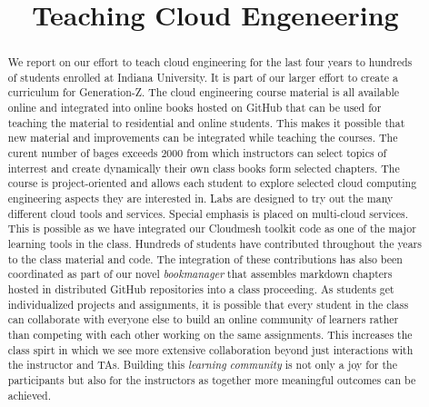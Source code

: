 \documentclass[conference]{IEEEtran}
\begin{document}
\title{Teaching Cloud Engeneering}

\author{
\and
{}
}

\maketitle

\begin{abstract}
  
  We report on our effort to teach cloud engineering for the last four
  years to hundreds of students enrolled at Indiana University. It is
  part of our larger effort to create a curriculum for
  Generation-Z. The cloud engineering course material is all available
  online and integrated into online books hosted on GitHub that can be
  used for teaching the material to residential and online
  students. This makes it possible that new material and improvements
  can be integrated while teaching the courses.  The curent number of
  bages exceeds 2000 from which instructors can select topics of
  interrest and create dynamically their own class books form selected
  chapters. The course is
  project-oriented and allows each student to explore selected cloud
  computing engineering aspects they are interested in. Labs are
  designed to try out the many different cloud tools and
  services. Special emphasis is placed on multi-cloud services. This
  is possible as we have integrated our Cloudmesh toolkit code as one
  of the major learning tools in the class. Hundreds of students have
  contributed throughout the years to the class material and code. The
  integration of these contributions has also been coordinated as part
  of our novel {\em bookmanager} that assembles markdown chapters
  hosted in distributed GitHub repositories into a class
  proceeding. As students get individualized projects and assignments,
  it is possible that every student in the class can collaborate with
  everyone else to build an online community of learners rather than
  competing with each other working on the same assignments. This
  increases the class spirt in which we see more extensive
  collaboration beyond just interactions with the instructor and TAs.
  Building this {\em learning community} is not only a joy for the
  participants but also for the instructors as together more
  meaningful outcomes can be achieved.
  
\end{abstract}
\end{document}
